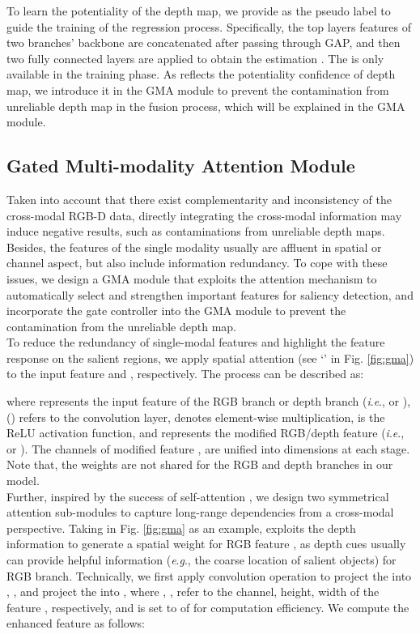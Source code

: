\documentclass[journal]{IEEEtran}
\newcommand{\ie}{\textit{i}.\textit{e}.}
\newcommand{\eg}{\textit{e}.\textit{g}.}
\begin{document}
\indent To learn the potentiality of the depth map, we provide  as the pseudo label  to guide the training of the regression process. Specifically, the top layers features of two branches' backbone are concatenated after passing through GAP, and then two fully connected layers are applied to obtain the estimation . The  is only available in the training phase. As  reflects the potentiality confidence of depth map, we introduce it in the GMA module to prevent the contamination from unreliable depth map in the fusion process, which will be explained in the GMA module.




\subsection{Gated Multi-modality Attention Module}
Taken into account that there exist complementarity and inconsistency of the cross-modal RGB-D data, directly integrating the cross-modal information may induce negative results, such as contaminations from unreliable depth maps. Besides, the features of the single modality usually are affluent in spatial or channel aspect, but also include information redundancy.
To cope with these issues, we design a GMA module that exploits the attention mechanism to automatically select and strengthen important features for saliency detection, and incorporate the gate controller into the GMA module to prevent the contamination from the unreliable depth map. \\
\indent To reduce the redundancy of single-modal features and highlight the feature response on the salient regions, we apply spatial attention (see `' in Fig. \ref{fig:gma}) to the input feature  and , respectively. The process can be described as:

where  represents the input feature of the RGB branch or depth branch (\ie,  or ),  () refers to the convolution layer,  denotes element-wise multiplication,  is the ReLU activation function, and  represents the modified RGB/depth feature (\ie,  or ).
The channels of modified feature ,  are unified into  dimensions at each stage. Note that, the weights are not shared for the RGB and depth branches in our model.\\
\indent Further, inspired by the success of self-attention \cite{vaswani2017attention,wang2018non}, we design two symmetrical attention sub-modules to capture long-range dependencies from a cross-modal perspective. Taking  in Fig. \ref{fig:gma} as an example,
 exploits the depth information to generate a spatial weight for RGB feature , as depth cues usually can provide helpful information (\eg, the coarse location of salient objects) for RGB branch.
Technically, we first apply  convolution operation to project the  into , , and project the  into , where , ,  refer to the channel, height, width of the feature , respectively, and  is set to  of  for computation efficiency.
We compute the enhanced feature as follows:
\end{document}
